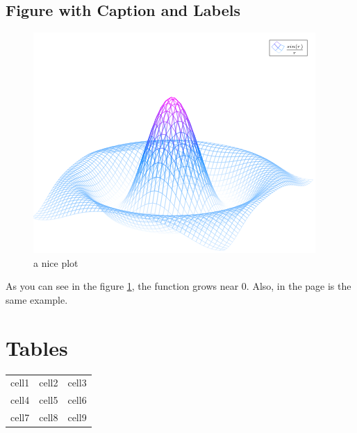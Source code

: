 \documentclass[12pt, letterpaper]{article}
\begin{document}
\subsection{Figure with Caption and Labels}
\begin{figure}[h]
    \centering
    \includegraphics[scale = 0.5]{mesh}
    \caption{a nice plot}
    \label{fig:mesh1}
\end{figure}

As you can see in the figure \ref{fig:mesh1}, the function grows near 0. Also, in the page \pageref{fig:mesh1} 
is the same example.

\section{Tables}   

\begin{center}
    \begin{tabular}{c c c}
        cell1 & cell2 & cell3 \\ 
        cell4 & cell5 & cell6 \\  
        cell7 & cell8 & cell9 
    \end{tabular}
\end{center}
\end{document}
